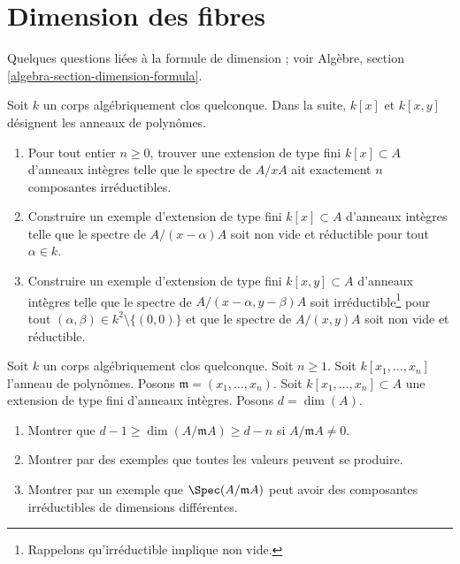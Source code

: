 \section{Dimension des fibres}
\label{section-dimension-fibres}

\noindent
Quelques questions liées à la formule de dimension ; voir
Algèbre, section \ref{algebra-section-dimension-formula}.

\begin{exercise}
\label{exercise-nr-components-fibre}
Soit $k$ un corps algébriquement clos quelconque.
Dans la suite, $k[x]$ et $k[x, y]$ désignent les anneaux de polynômes.
\begin{enumerate}
\item Pour tout entier $n \geq 0$, trouver une extension de type fini
$k[x] \subset A$ d'anneaux intègres telle que le spectre de $A/xA$
ait exactement $n$ composantes irréductibles.
\item Construire un exemple d'extension de type fini $k[x] \subset A$
d'anneaux intègres telle que le spectre de $A/(x - \alpha)A$
soit non vide et réductible pour tout $\alpha \in k$.
\item Construire un exemple d'extension de type fini $k[x, y] \subset A$
d'anneaux intègres telle que le spectre de $A/(x - \alpha, y - \beta)A$
soit irréductible\footnote{Rappelons qu'irréductible implique non vide.}
pour tout $(\alpha, \beta) \in k^2 \setminus \{(0, 0)\}$
et que le spectre de $A/(x, y)A$ soit non vide et réductible.
\end{enumerate}
\end{exercise}

\begin{exercise}
\label{exercise-codim-1}
Soit $k$ un corps algébriquement clos quelconque.
Soit $n \geq 1$.
Soit $k[x_1, \ldots, x_n]$ l'anneau de polynômes.
Posons $\mathfrak m = (x_1, \ldots, x_n)$.
Soit $k[x_1, \ldots, x_n] \subset A$ une extension de type fini
d'anneaux intègres. Posons $d = \dim(A)$.
\begin{enumerate}
\item Montrer que $d - 1 \geq \dim(A/\mathfrak m A) \geq d - n$
si $A/\mathfrak mA \not = 0$.
\item Montrer par des exemples que toutes les valeurs peuvent se produire.
\item Montrer par un exemple que $\Spec(A/\mathfrak m A)$ peut
avoir des composantes irréductibles de dimensions différentes.
\end{enumerate}
\end{exercise}




